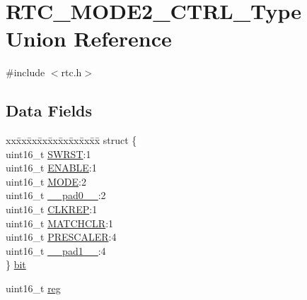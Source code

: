 \hypertarget{union_r_t_c___m_o_d_e2___c_t_r_l___type}{}\section{R\+T\+C\+\_\+\+M\+O\+D\+E2\+\_\+\+C\+T\+R\+L\+\_\+\+Type Union Reference}
\label{union_r_t_c___m_o_d_e2___c_t_r_l___type}


{\ttfamily \#include $<$rtc.\+h$>$}

\subsection*{Data Fields}
\begin{DoxyCompactItemize}
\item 
\begin{tabbing}
xx\=xx\=xx\=xx\=xx\=xx\=xx\=xx\=xx\=\kill
struct \{\\
\>uint16\_t \mbox{\hyperlink{union_r_t_c___m_o_d_e2___c_t_r_l___type_a4987fcca11694bd2ffae6a773a9bfc24}{SWRST}}:1\\
\>uint16\_t \mbox{\hyperlink{union_r_t_c___m_o_d_e2___c_t_r_l___type_aec203800ebef356dc04f3e8986a824d8}{ENABLE}}:1\\
\>uint16\_t \mbox{\hyperlink{union_r_t_c___m_o_d_e2___c_t_r_l___type_abd348ee828aadd0781f3fa97d167e564}{MODE}}:2\\
\>uint16\_t \mbox{\hyperlink{union_r_t_c___m_o_d_e2___c_t_r_l___type_a77132c2c26a75f5b8751b235cda23828}{\_\_pad0\_\_}}:2\\
\>uint16\_t \mbox{\hyperlink{union_r_t_c___m_o_d_e2___c_t_r_l___type_ad9b52b9b8f747be90f0ecd6abe20b8f3}{CLKREP}}:1\\
\>uint16\_t \mbox{\hyperlink{union_r_t_c___m_o_d_e2___c_t_r_l___type_a65c02be208134a4798cf1e0e5c5b6c27}{MATCHCLR}}:1\\
\>uint16\_t \mbox{\hyperlink{union_r_t_c___m_o_d_e2___c_t_r_l___type_a30db59a1afd851a8a4acd5d8605ca6ba}{PRESCALER}}:4\\
\>uint16\_t \mbox{\hyperlink{union_r_t_c___m_o_d_e2___c_t_r_l___type_ab72e3a1f2f7db8695c60c658f5a0f11a}{\_\_pad1\_\_}}:4\\
\} \mbox{\hyperlink{union_r_t_c___m_o_d_e2___c_t_r_l___type_af144a9c2d392db2486be23272aac5db2}{bit}}\\

\end{tabbing}\item 
uint16\+\_\+t \mbox{\hyperlink{union_r_t_c___m_o_d_e2___c_t_r_l___type_a11760f5020019f4aa8cb02e694f7cc44}{reg}}
\end{DoxyCompactItemize}


